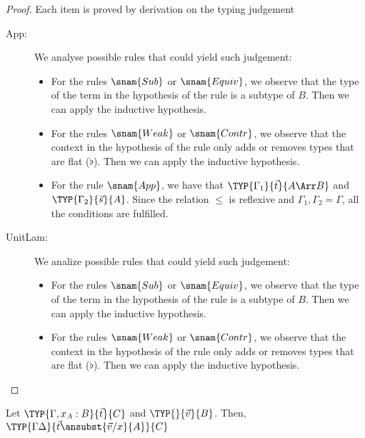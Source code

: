 \begin{proof}
    Each item is proved by derivation on the typing judgement
    \begin{description}
        \item[App:] We analyse possible rules that could yield such judgement:
        \begin{itemize}
            \item For the rules $\snam{Sub}$ or $\snam{Equiv}$, we observe that the type of the term in the hypothesis of the rule is a subtype of $B$. Then we can apply the inductive hypothesis.
            
            \item For the rules $\snam{Weak}$ or $\snam{Contr}$, we observe that the context in the hypothesis of the rule only adds or removes types that are flat ($\flat$). Then we can apply the inductive hypothesis.
            
            \item For the rule $\snam{App}$, we have that $\TYP{\Gamma_1}{\vec{t}}{A\Arr B}$ and $\TYP{\Gamma_2}{\vec{s}}{A}$. Since the relation $\leq$ is reflexive and $\Gamma_1 ,\Gamma_2 = \Gamma$, all the conditions are fulfilled.
        \end{itemize}
        
        \item[UnitLam:] We analize possible rules that could yield such judgement:
        \begin{itemize}
            \item For the rules $\snam{Sub}$ or $\snam{Equiv}$, we observe that the type of the term in the hypothesis of the rule is a subtype of $B$. Then we can apply the inductive hypothesis.
            
            \item For the rules $\snam{Weak}$ or $\snam{Contr}$, we observe that the context in the hypothesis of the rule only adds or removes types that are flat ($\flat$). Then we can apply the inductive hypothesis. 
        \end{itemize}
    \end{description}
\end{proof}


\begin{lemma}
    Let $\TYP{\Gamma, x_A:B}{\vec{t}}{C}$ and $\TYP{}{\vec{v}}{B}$. Then, $\TYP{\Gamma\Delta}{\vec{t}\ansubst{\vec{v}/x}{A}}{C}$ 
\end{lemma}

